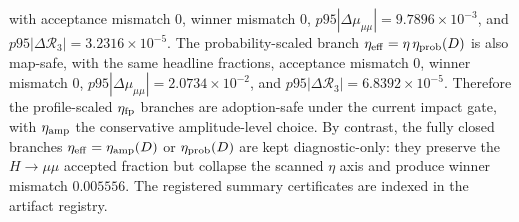 \documentclass[aps,prd,onecolumn,notitlepage,nofootinbib,superscriptaddress,11pt,floatfix]{revtex4-2}
\begin{document}
with acceptance mismatch \(0\), winner mismatch \(0\), \(p95|\Delta\mu_{\mu\mu}|=9.7896\times10^{-3}\), and \(p95|\Delta\mathcal R_3|=3.2316\times10^{-5}\).  The probability-scaled branch \(\eta_{\rm eff}=\eta\,\eta_{\rm prob}(D)\) is also map-safe, with the same headline fractions, acceptance mismatch \(0\), winner mismatch \(0\), \(p95|\Delta\mu_{\mu\mu}|=2.0734\times10^{-2}\), and \(p95|\Delta\mathcal R_3|=6.8392\times10^{-5}\).  Therefore the profile-scaled \(\eta_{\rm fp}\) branches are adoption-safe under the current impact gate, with \(\eta_{\rm amp}\) the conservative amplitude-level choice.  By contrast, the fully closed branches \(\eta_{\rm eff}=\eta_{\rm amp}(D)\) or \(\eta_{\rm prob}(D)\) are kept diagnostic-only: they preserve the \(H\to\mu\mu\) accepted fraction but collapse the scanned $\eta$ axis and produce winner mismatch \(0.005556\).  The registered summary certificates are indexed in the artifact registry.
\end{document}
